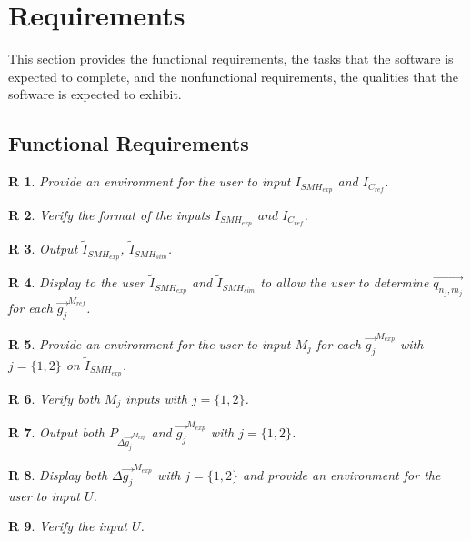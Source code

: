 \documentclass[12pt]{article}
\newtheorem{R}{R}
\begin{document}
\section{Requirements}

This section provides the functional requirements, the tasks that the
software is expected to complete, and the nonfunctional requirements, the
qualities that the software is expected to exhibit.

\subsection{Functional Requirements}

\begin{R}
\label{R_1}
\normalfont Provide an environment for the user to input $I_{SMH_{exp}}$ and $I_{C_{ref}}$.
\end{R}
\begin{R}
\label{R_2}
\normalfont Verify the format of the inputs $I_{SMH_{exp}}$ and $I_{C_{ref}}$.
\end{R}
\begin{R}
\label{R_3}
\normalfont Output $\widetilde{I}_{SMH_{exp}}$, $\widetilde{I}_{SMH_{sim}}$.
\end{R}
\begin{R}
\label{R_4}
\normalfont Display to the user $\widetilde{I}_{SMH_{exp}}$ and $\widetilde{I}_{SMH_{sim}}$ to allow the user to determine $\overrightarrow{q_{n_j,m_j}}$ for each $\overrightarrow{g_j}^{M_{ref}}$.
\end{R}
\begin{R}
\label{R_5}
\normalfont Provide an environment for the user to input $M_j$ for each $\overrightarrow{g_{j}}^{M_{exp}}$ with $j=\{1,2\}$ on $\widetilde{I}_{SMH_{exp}}$.
\end{R}
\begin{R}
\label{R_6}
\normalfont Verify both $M_j$ inputs with $j=\{1,2\}$.
\end{R}
\begin{R}
\label{R_7}
\normalfont Output both $P_{\Delta \overrightarrow{g_{j}}^{M_{exp}}}$ and $\overrightarrow{g_{j}}^{M_{exp}}$ with $j=\{1,2\}$.
\end{R}
\begin{R}
\label{R_8}
\normalfont Display both $\Delta \overrightarrow{g_{j}}^{M_{exp}}$  with $j=\{1,2\}$ and provide an environment for the user to input $U$.
\end{R}
\begin{R}
\label{R_9}
\normalfont Verify the input $U$.
\end{R}
\end{document}
